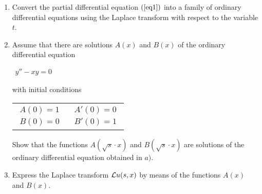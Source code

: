 \documentclass[
	final,
	a4paper,
	oneside,
	parskip=full,
	headings=standardclasses,
	headings=big,
	pointednumbers
]{scrartcl}
\newcommand{\kl}[1]{{\left( #1 \right)}}
\begin{document}
    \begin{enumerate}
        \item{
            Convert the partial differential equation $\kl{\ref{eq1}}$ into a family of
            ordinary differential equations using the Laplace transform with respect to
            the variable $t$.
        }
        \item{
            Assume that there are solutions $A\kl{x}$ and $B\kl{x}$ of the ordinary
            differential equation

            \begin{center}
                \vspace{-3mm}
                $\begin{aligned}
                    y'' - xy = 0
                \end{aligned}$
                \vspace{-3mm}
            \end{center}

            with initial conditions

            \begin{center}
                \vspace{-3mm}
                \begin{tabular}{@{} l l }
                    \rule{0pt}{4ex}$\begin{aligned}
                        A\kl{0} = 1 \\
                        B\kl{0} = 0
                    \end{aligned}$ &
                    $\begin{aligned}
                        A'\kl{0} = 0 \\
                        B'\kl{0} = 1
                    \end{aligned}$
                \end{tabular}
                \vspace{-3mm}
            \end{center}

            Show that the functions $A\kl{\sqrt{s} \cdot x}$ and $B\kl{\sqrt{s} \cdot x}$ are
            solutions of the ordinary differential equation obtained in $a)$.
        }
        \item{
            Express the Laplace transform $\lap u \kl{s,x}$ by means of the
            functions $A\kl{x}$ and $B\kl{x}$.
        }
    \end{enumerate}
\end{document}
